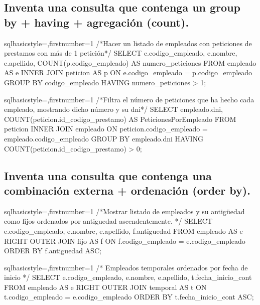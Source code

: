 	\subsection{Inventa una consulta que contenga un group by + having + agregación (count).}
		\begin{sourcecodep}[]{sql}{basicstyle={\fontsize{10}{10}\selectfont\ttfamily},firstnumber=1}{}
			/*Hacer un listado de empleados con peticiones de prestamos con más de 1 petición*/
			SELECT e.codigo_empleado, e.nombre, e.apellido, COUNT(p.codigo_empleado) AS numero_peticiones FROM empleado AS e
				INNER JOIN peticion AS p ON e.codigo_empleado = p.codigo_empleado
				GROUP BY codigo_empleado
				HAVING numero_peticiones > 1;\end{sourcecodep}
		\begin{sourcecodep}[]{sql}{basicstyle={\fontsize{10}{10}\selectfont\ttfamily},firstnumber=1}{}
			/*Filtra el número de peticiones que ha hecho cada empleado, mostrando dicho número y su dni*/
			SELECT empleado.dni, COUNT(peticion.id_codigo_prestamo) AS PeticionesPorEmpleado
				FROM peticion
				INNER JOIN empleado ON peticion.codigo_empleado = empleado.codigo_empleado
				GROUP BY empleado.dni
				HAVING COUNT(peticion.id_codigo_prestamo) > 0;\end{sourcecodep}
	\subsection{Inventa una consulta que contenga una combinación externa + ordenación (order by).}
		\begin{sourcecodep}[]{sql}{basicstyle={\fontsize{10}{10}\selectfont\ttfamily},firstnumber=1}{}
			/*Mostrar listado de empleados y su antigüedad como fijos ordenados por antiguedad ascendentemente. */
			SELECT e.codigo_empleado, e.nombre, e.apellido, f.antiguedad FROM empleado AS e
				RIGHT OUTER JOIN fijo AS f ON f.codigo_empleado = e.codigo_empleado 
				ORDER BY f.antiguedad ASC;\end{sourcecodep}
		\begin{sourcecodep}[]{sql}{basicstyle={\fontsize{10}{10}\selectfont\ttfamily},firstnumber=1}{}
			/* Empleados temporales ordenados por fecha de inicio */
			SELECT e.codigo_empleado, e.nombre, e.apellido, t.fecha_inicio_cont FROM empleado AS e
				RIGHT OUTER JOIN temporal AS t ON t.codigo_empleado = e.codigo_empleado
				ORDER BY t.fecha_inicio_cont ASC;\end{sourcecodep}
